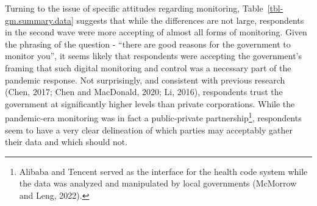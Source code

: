 \documentclass[
  letterpaper,
  DIV=11,
  numbers=noendperiod]{scrartcl}
\begin{document}
\hypertarget{tbl-gp.summary.data}{}
\begin{table}
\caption{\label{tbl-gp.summary.data}Government performance data }\tabularnewline

\centering
{}
\end{table}

Turning to the issue of specific attitudes regarding monitoring,
Table~\ref{tbl-gm.summary.data} suggests that while the differences are
not large, respondents in the second wave were more accepting of almost
all forms of monitoring. Given the phrasing of the question - ``there
are good reasons for the government to monitor you'', it seems likely
that respondents were accepting the government's framing that such
digital monitoring and control was a necessary part of the pandemic
response. Not surprisingly, and consistent with previous research (Chen,
2017; Chen and MacDonald, 2020; Li, 2016), respondents trust the
government at significantly higher levels than private corporations.
While the pandemic-era monitoring was in fact a public-private
partnership\footnote{Alibaba and Tencent served as the interface for the
  health code system while the data was analyzed and manipulated by
  local governments (McMorrow and Leng, 2022).}, respondents seem to
have a very clear delineation of which parties may acceptably gather
their data and which should not.
\end{document}

